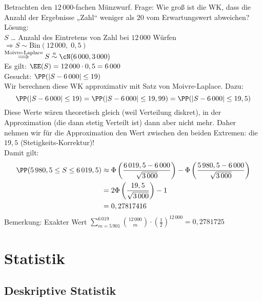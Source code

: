 \documentclass{scrreprt}
\begin{document}
 Betrachten den $12\, 000$-fachen Münzwurf. Frage: Wie groß ist die WK, dass die Anzahl der Ergebnisse „Zahl“ weniger als $20$ vom Erwartungswert abweichen?\\
Lösung:\\
$S$ … Anzahl des Eintretens von Zahl bei $12\, 000$ Würfen\\
$\Rightarrow S\sim \mathrm{Bin}(12\,000,\; 0,5)$\\
$\overset{\text{Moivre-Laplace}}{\Longrightarrow} S \overset{a}{\sim} \cN (6\,000, 3\,000)$\\
Es gilt: $\EE(S)=12\,000 \cdot 0,5 = 6\,000$\\
Gesucht: $\PP(|S-6\,000|\leq 19)$\\
Wir berechnen diese WK approximativ mit Satz von Moivre-Laplace. Dazu: 
$$\PP(|S-6\,000|\leq 19)=\PP(|S-6\,000|\leq 19,99) = \PP(|S-6\,000|\leq 19,5)$$
Diese Werte wären theoretisch gleich (weil Verteilung diskret), in der Approximation (die dann stetig Verteilt ist) dann aber nicht mehr. Daher nehmen wir für die Approximation den Wert zwischen den beiden Extremen: die $19,5$ (Stetigkeits-Korrektur)!\\
Damit gilt:
\begin{align*}
\PP(5\,980,5 \leq S \leq 6\,019,5)&\approx \Phi\left(\frac{6\,019,5-6\,000}{\sqrt{3\,000}}\right) - \Phi \left( \frac{5\,980,5-6\,000}{\sqrt{3\,000}}\right) \\
&= 2 \Phi \left( \frac{19,5}{\sqrt{3\,000}}\right)-1 \\
&= 0,27817416
\end{align*}
Bemerkung: Exakter Wert $\sum_{m=5\,901}^{6\,019} \binom{12\,000}{m}\cdot \left(\frac{1}{2}\right)^{12\,000}=0,2781725$

\chapter{Statistik}
\section{Deskriptive Statistik}
\end{document}
